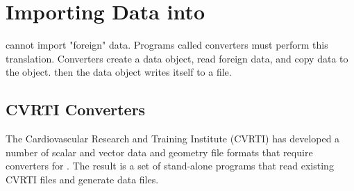 %
%
%
%
%

\section{Importing Data into \sr{}}
\label{sec:import} 

\sr{} cannot import "foreign" data. Programs called converters must perform this translation. Converters create a \sr{} data object, read foreign data, and copy data to the object. then the \sr{} data object writes itself to a file.

\subsection{CVRTI Converters}

The Cardiovascular Research and Training Institute (CVRTI) has developed a
number of scalar and vector data and geometry file formats that require
converters for \sr{}.  The result is a set of stand-alone programs that read
existing CVRTI files and generate \sr{} data files.

